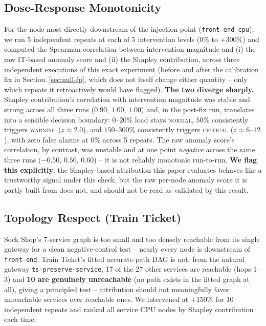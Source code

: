 \documentclass[journal, 10pt]{IEEEtran}
\begin{document}
\subsection{Dose-Response Monotonicity}
\label{sec:dose-response}
For the node most directly downstream of the injection point (\texttt{front-end\_cpu}), we ran 5 independent repeats at each of 5 intervention levels ($0\%$ to $+300\%$) and computed the Spearman correlation between intervention magnitude and (i) the raw IT-based anomaly score and (ii) the Shapley contribution, across three independent executions of this exact experiment (before and after the calibration fix in Section~\ref{sec:null-fp}, which does not itself change either quantity -- only which repeats it retroactively would have flagged). \textbf{The two diverge sharply.} Shapley contribution's correlation with intervention magnitude was stable and strong across all three runs ($0.90$, $1.00$, $1.00$) and, in the post-fix run, translates into a sensible decision boundary: $0$--$20\%$ load stays \textsc{normal}, $50\%$ consistently triggers \textsc{warning} ($z\approx2.0$), and $150$--$300\%$ consistently triggers \textsc{critical} ($z\approx6$--$12$), with zero false alarms at $0\%$ across 5 repeats. The raw anomaly score's correlation, by contrast, was unstable and at one point \emph{negative} across the same three runs ($-0.50$, $0.50$, $0.60$) -- it is not reliably monotonic run-to-run. \textbf{We flag this explicitly}: the Shapley-based attribution this paper evaluates behaves like a trustworthy signal under this check, but the raw per-node anomaly score it is partly built from does not, and should not be read as validated by this result.

\subsection{Topology Respect (Train Ticket)}
\label{sec:topology}
Sock Shop's 7-service graph is too small and too densely reachable from its single gateway for a clean negative-control test -- nearly every node is downstream of \texttt{front-end}. Train Ticket's fitted accurate-path DAG is not: from the natural gateway \texttt{ts-preserve-service}, 17 of the 27 other services are reachable (hops 1--3) and \textbf{10 are genuinely unreachable} (no path exists in the fitted graph at all), giving a principled test -- attribution should not meaningfully favor unreachable services over reachable ones. We intervened at $+150\%$ for 10 independent repeats and ranked all service CPU nodes by Shapley contribution each time.
\end{document}

